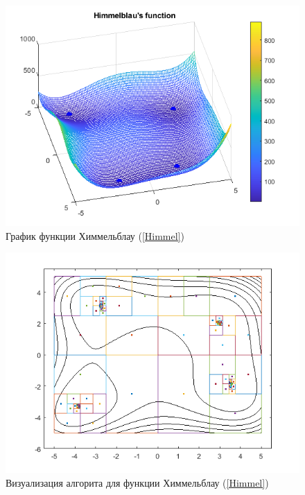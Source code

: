 \documentclass[12pt,a4paper]{article}
\begin{document}
                \begin{figure}[H]
                    \centering
                    \includegraphics[width=13cm]{Himmablau2.png}
                    \caption{График функции Химмельблау (\ref{Himmel})}
                    \label{fig:Himmel2}
                \end{figure}
    	    
    	        \begin{figure}[H]
                    \centering
                    \includegraphics[width=13cm]{Himmablau_vizualization.png}
                    \caption{Визуализация алгорита для функции Химмельблау (\ref{Himmel})} \label{fig:Himmel_vizualization}
                \end{figure}
    	    
\end{document}
